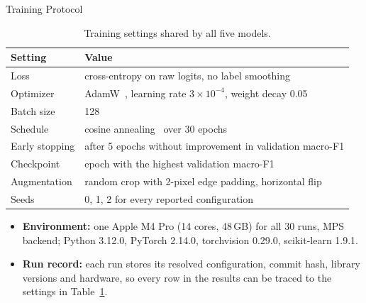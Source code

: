 \begin{frame}{Training Protocol}
\begin{table}
\centering
\caption{Training settings shared by all five models.}
\label{tab:protocol}
\small
\begin{tabular}{ll}
\toprule
\textbf{Setting} & \textbf{Value} \\
\midrule
Loss          & cross-entropy on raw logits, no label smoothing \\
Optimizer     & AdamW~\cite{loshchilov2019decoupled}, learning rate $3 \times 10^{-4}$, weight decay 0.05 \\
Batch size    & 128 \\
Schedule      & cosine annealing~\cite{loshchilov2017sgdr} over 30 epochs \\
Early stopping & after 5 epochs without improvement in validation macro-F1 \\
Checkpoint    & epoch with the highest validation macro-F1 \\
Augmentation  & random crop with 2-pixel edge padding, horizontal flip \\
Seeds         & 0, 1, 2 for every reported configuration \\
\bottomrule
\end{tabular}
\end{table}

\small
\begin{itemize}
    \item \textbf{Environment:} one Apple M4 Pro (14 cores, 48\,GB) for all 30 runs, MPS backend;
          Python 3.12.0, PyTorch 2.14.0, torchvision 0.29.0, scikit-learn 1.9.1.
    \item \textbf{Run record:} each run stores its resolved configuration, commit hash, library versions and hardware,
          so every row in the results can be traced to the settings in Table~\ref{tab:protocol}.
\end{itemize}
\end{frame}

